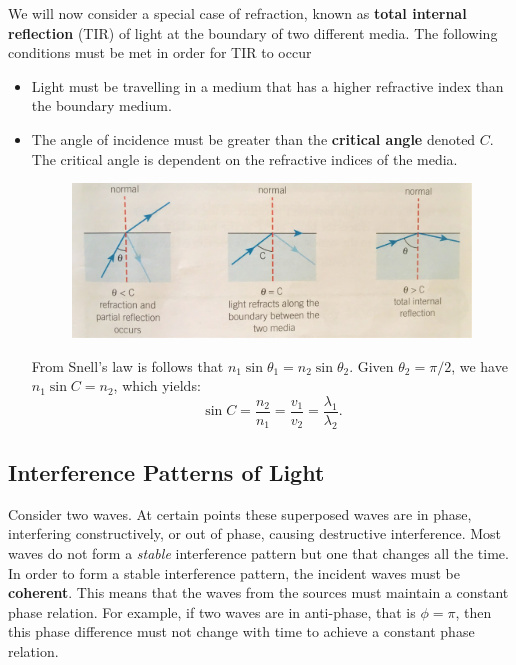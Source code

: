 We will now consider a special case of refraction, known as \textbf{total internal reflection} (TIR) of light at the boundary of two different media. The following conditions must be met in order for TIR to occur
\begin{itemize}
    \item Light must be travelling in a medium that has a higher refractive index than the boundary medium.
    \item The angle of incidence must be greater than the \textbf{critical angle} denoted $C$. The critical angle is dependent on the refractive indices of the media.
    \begin{figure}[h!]
        \centering
        \includegraphics[scale=0.1]{notes/images/Critical-Angle.JPG}
    \end{figure}
    \FloatBarrier
    From Snell's law is follows that $n_1 \sin \theta_1 = n_2 \sin \theta_2$. Given $\theta_2 = \pi / 2$, we have $n_1 \sin C = n_2$, which yields:
    \begin{equation}
        \sin C = \frac{n_2}{n_1} = \frac{v_1}{v_2} = \frac{\lambda_1}{\lambda_2}. 
    \end{equation}
\end{itemize}



\subsection{Interference Patterns of Light}

Consider two waves. At certain points these superposed waves are in phase, interfering constructively, or out of phase, causing destructive interference. Most waves do not form a \textit{stable} interference pattern but one that changes all the time. In order to form a stable interference pattern, the incident waves must be \textbf{coherent}. This means that the waves from the sources must maintain a constant phase relation. For example, if two waves are in anti-phase, that is $\phi = \pi$, then this phase difference must not change with time to achieve a constant phase relation. 

